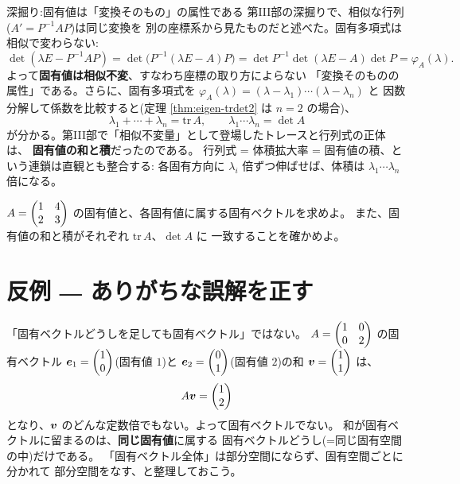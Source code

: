 \begin{itembox}[l]{深掘り:固有値は「変換そのもの」の属性である}
第III部の深掘りで、相似な行列($A' = P^{-1}AP$)は同じ変換を
別の座標系から見たものだと述べた。固有多項式は相似で変わらない:
\[
\det(\lambda E - P^{-1}AP) = \det\bigl(P^{-1}(\lambda E - A)P\bigr)
= \det P^{-1} \det(\lambda E - A) \det P = \varphi_A(\lambda).
\]
よって\textbf{固有値は相似不変}、すなわち座標の取り方によらない
「変換そのものの属性」である。さらに、固有多項式を
$\varphi_A(\lambda) = (\lambda - \lambda_1)\cdots(\lambda - \lambda_n)$ と
因数分解して係数を比較すると(定理 \ref{thm:eigen-trdet2} は $n = 2$ の場合)、
\[
\lambda_1 + \cdots + \lambda_n = \mathrm{tr}\,A,
\qquad
\lambda_1 \cdots \lambda_n = \det A
\]
が分かる。第III部で「相似不変量」として登場したトレースと行列式の正体は、
\textbf{固有値の和と積}だったのである。
行列式 = 体積拡大率 = 固有値の積、という連鎖は直観とも整合する:
各固有方向に $\lambda_i$ 倍ずつ伸ばせば、体積は $\lambda_1 \cdots \lambda_n$ 倍になる。
\end{itembox}

\begin{mondai}\label{q:eigen}
$A = \begin{pmatrix}1 & 4 \\ 2 & 3\end{pmatrix}$ の固有値と、各固有値に属する固有ベクトルを求めよ。
また、固有値の和と積がそれぞれ $\mathrm{tr}\,A$、$\det A$ に
一致することを確かめよ。
\end{mondai}

\section{反例 ― ありがちな誤解を正す}

\begin{hanrei}[固有ベクトルの和は固有ベクトルとは限らない]\label{hanrei:eigen-sum}
「固有ベクトルどうしを足しても固有ベクトル」ではない。
$A = \begin{pmatrix}1 & 0 \\ 0 & 2\end{pmatrix}$ の固有ベクトル
$\bm{e}_1 = \begin{pmatrix}1 \\ 0\end{pmatrix}$(固有値 $1$)と
$\bm{e}_2 = \begin{pmatrix}0 \\ 1\end{pmatrix}$(固有値 $2$)の和
$\bm{v} = \begin{pmatrix}1 \\ 1\end{pmatrix}$ は、
\[
A\bm{v} = \begin{pmatrix}1 \\ 2\end{pmatrix}
\]
となり、$\bm{v}$ のどんな定数倍でもない。よって固有ベクトルでない。
和が固有ベクトルに留まるのは、\textbf{同じ固有値}に属する
固有ベクトルどうし(=同じ固有空間の中)だけである。
「固有ベクトル全体」は部分空間にならず、固有空間ごとに分かれて
部分空間をなす、と整理しておこう。
\end{hanrei}


